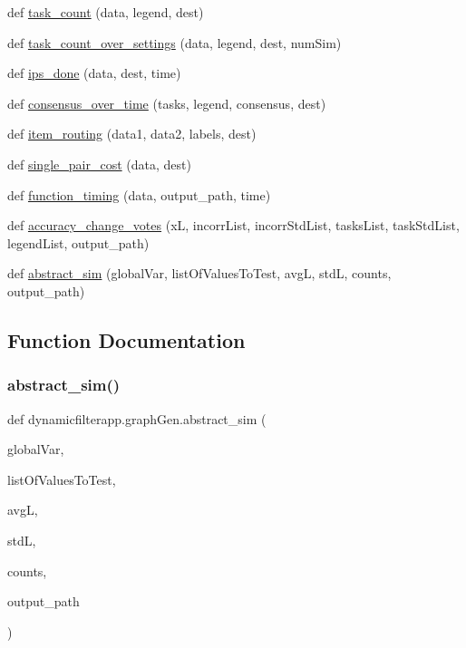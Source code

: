\begin{DoxyCompactItemize}
def \mbox{\hyperlink{namespacedynamicfilterapp_1_1graph_gen_a8db1f76661e4aea8b1d2145681ae2696}{task\+\_\+count}} (data, legend, dest)
\item 
def \mbox{\hyperlink{namespacedynamicfilterapp_1_1graph_gen_a29b3308a8c942d63d818e0ac5fea6920}{task\+\_\+count\+\_\+over\+\_\+settings}} (data, legend, dest, num\+Sim)
\item 
def \mbox{\hyperlink{namespacedynamicfilterapp_1_1graph_gen_a94b7f314ce8dfce16b7776cba4129992}{ips\+\_\+done}} (data, dest, time)
\item 
def \mbox{\hyperlink{namespacedynamicfilterapp_1_1graph_gen_ae4d60fdc4756e001059acb14cbb6821c}{consensus\+\_\+over\+\_\+time}} (tasks, legend, consensus, dest)
\item 
def \mbox{\hyperlink{namespacedynamicfilterapp_1_1graph_gen_a9e34d7128010818130474df31fac89c5}{item\+\_\+routing}} (data1, data2, labels, dest)
\item 
def \mbox{\hyperlink{namespacedynamicfilterapp_1_1graph_gen_a09e4e7b19b279838511f1806d4f7f2bd}{single\+\_\+pair\+\_\+cost}} (data, dest)
\item 
def \mbox{\hyperlink{namespacedynamicfilterapp_1_1graph_gen_a829d8f63431b6a26381a167956e0c3a2}{function\+\_\+timing}} (data, output\+\_\+path, time)
\item 
def \mbox{\hyperlink{namespacedynamicfilterapp_1_1graph_gen_ab75745d1f7f725285dba82b7e5d27e50}{accuracy\+\_\+change\+\_\+votes}} (xL, incorr\+List, incorr\+Std\+List, tasks\+List, task\+Std\+List, legend\+List, output\+\_\+path)
\item 
def \mbox{\hyperlink{namespacedynamicfilterapp_1_1graph_gen_a19198a79ec71a19f9461487769b622f8}{abstract\+\_\+sim}} (global\+Var, list\+Of\+Values\+To\+Test, avgL, stdL, counts, output\+\_\+path)
\end{DoxyCompactItemize}


\subsection{Function Documentation}
\mbox{\label{namespacedynamicfilterapp_1_1graph_gen_a19198a79ec71a19f9461487769b622f8}} 
\subsubsection{\texorpdfstring{abstract\_sim()}{abstract\_sim()}}
{\footnotesize\ttfamily def dynamicfilterapp.\+graph\+Gen.\+abstract\+\_\+sim (\begin{DoxyParamCaption}\item[{}]{global\+Var,  }\item[{}]{list\+Of\+Values\+To\+Test,  }\item[{}]{avgL,  }\item[{}]{stdL,  }\item[{}]{counts,  }\item[{}]{output\+\_\+path }\end{DoxyParamCaption})}

